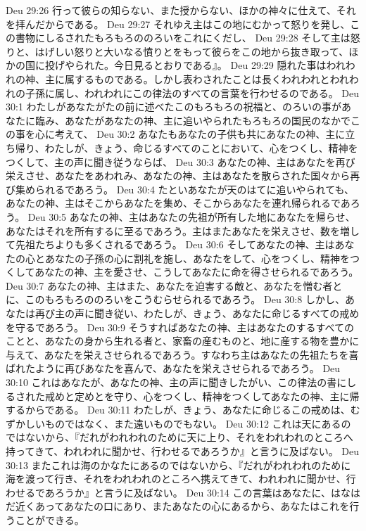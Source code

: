 Deu 29:26  行って彼らの知らない、また授からない、ほかの神々に仕えて、それを拝んだからである。
Deu 29:27  それゆえ主はこの地にむかって怒りを発し、この書物にしるされたもろもろののろいをこれにくだし、
Deu 29:28  そして主は怒りと、はげしい怒りと大いなる憤りとをもって彼らをこの地から抜き取って、ほかの国に投げやられた。今日見るとおりである』。
Deu 29:29  隠れた事はわれわれの神、主に属するものである。しかし表わされたことは長くわれわれとわれわれの子孫に属し、われわれにこの律法のすべての言葉を行わせるのである。
Deu 30:1  わたしがあなたがたの前に述べたこのもろもろの祝福と、のろいの事があなたに臨み、あなたがあなたの神、主に追いやられたもろもろの国民のなかでこの事を心に考えて、
Deu 30:2  あなたもあなたの子供も共にあなたの神、主に立ち帰り、わたしが、きょう、命じるすべてのことにおいて、心をつくし、精神をつくして、主の声に聞き従うならば、
Deu 30:3  あなたの神、主はあなたを再び栄えさせ、あなたをあわれみ、あなたの神、主はあなたを散らされた国々から再び集められるであろう。
Deu 30:4  たといあなたが天のはてに追いやられても、あなたの神、主はそこからあなたを集め、そこからあなたを連れ帰られるであろう。
Deu 30:5  あなたの神、主はあなたの先祖が所有した地にあなたを帰らせ、あなたはそれを所有するに至るであろう。主はまたあなたを栄えさせ、数を増して先祖たちよりも多くされるであろう。
Deu 30:6  そしてあなたの神、主はあなたの心とあなたの子孫の心に割礼を施し、あなたをして、心をつくし、精神をつくしてあなたの神、主を愛させ、こうしてあなたに命を得させられるであろう。
Deu 30:7  あなたの神、主はまた、あなたを迫害する敵と、あなたを憎む者とに、このもろもろののろいをこうむらせられるであろう。
Deu 30:8  しかし、あなたは再び主の声に聞き従い、わたしが、きょう、あなたに命じるすべての戒めを守るであろう。
Deu 30:9  そうすればあなたの神、主はあなたのするすべてのことと、あなたの身から生れる者と、家畜の産むものと、地に産する物を豊かに与えて、あなたを栄えさせられるであろう。すなわち主はあなたの先祖たちを喜ばれたように再びあなたを喜んで、あなたを栄えさせられるであろう。
Deu 30:10  これはあなたが、あなたの神、主の声に聞きしたがい、この律法の書にしるされた戒めと定めとを守り、心をつくし、精神をつくしてあなたの神、主に帰するからである。
Deu 30:11  わたしが、きょう、あなたに命じるこの戒めは、むずかしいものではなく、また遠いものでもない。
Deu 30:12  これは天にあるのではないから、『だれがわれわれのために天に上り、それをわれわれのところへ持ってきて、われわれに聞かせ、行わせるであろうか』と言うに及ばない。
Deu 30:13  またこれは海のかなたにあるのではないから、『だれがわれわれのために海を渡って行き、それをわれわれのところへ携えてきて、われわれに聞かせ、行わせるであろうか』と言うに及ばない。
Deu 30:14  この言葉はあなたに、はなはだ近くあってあなたの口にあり、またあなたの心にあるから、あなたはこれを行うことができる。
